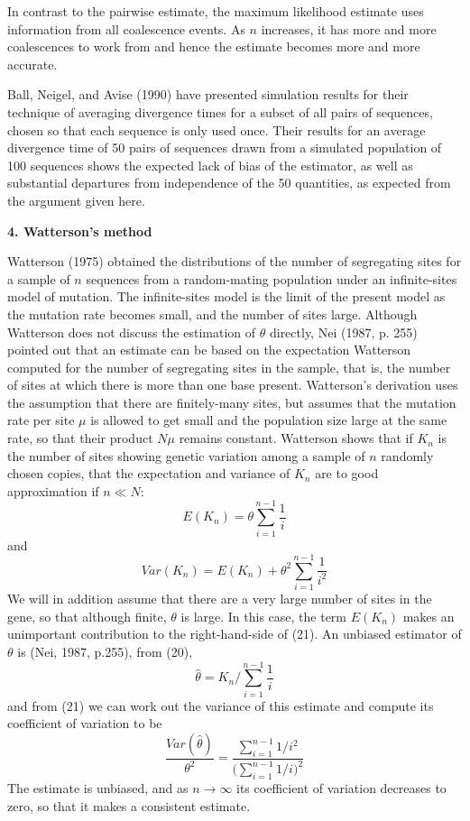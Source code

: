 In contrast to the pairwise estimate, the maximum likelihood estimate uses
information
from all coalescence events.  As $n$ increases, it has more and more
coalescences to work from and hence the estimate becomes more and more
accurate.

Ball, Neigel, and Avise (1990) have presented simulation results for
their technique of averaging divergence times for a subset of all pairs of
sequences, chosen so that each sequence is only used once.  Their
results for an average divergence time of 50 pairs of sequences drawn
from a simulated population of 100 sequences shows the expected lack of
bias of the estimator, as well as substantial departures from
independence of the 50 quantities, as expected from the argument given
here. 

\bigskip

{\bf 4. Watterson's method}

\medskip

Watterson (1975) obtained the distributions of the number of segregating
sites for a sample of $n$ sequences from a random-mating population under
an infinite-sites model of mutation.  The infinite-sites model is the
limit of the present model as the mutation rate becomes small, and the
number of sites large.    Although Watterson does not discuss the estimation
of $\theta$ directly, Nei (1987, p. 255) pointed out that an estimate can be
based on the expectation Watterson computed for the number of segregating
sites in the sample, that is, the
number of sites at which there is more than one base present.
Watterson's derivation uses the assumption that
there are finitely-many sites, but assumes that the mutation rate per site $\mu$
is allowed to get small and the population size large at the same rate,
so that their product $N\mu$ remains constant.  Watterson shows that
if $K_n$ is the number of sites showing genetic variation among a sample
of $n$ randomly chosen copies, that the expectation and variance of $K_n$
are to good approximation if $n \ll N$:
\begin{equation} %
E(K_n)  =  \theta \sum_{i=1}^{n-1} \frac{1}{i}
\end{equation}
and
\begin{equation} %
Var(K_n)  =  E(K_n) + \theta^2 \sum_{i=1}^{n-1} \frac{1}{i^2}
\end{equation}
We will in addition assume that there are a very large number of sites
in the gene, so that although finite, $\theta$ is large.  In this case,
the term $E(K_n)$ makes an unimportant contribution to the right-hand-side
of (21).  An unbiased estimator of $\theta$ is (Nei, 1987, p.255), from (20),
\begin{equation} %
\hat{\theta} =  K_n \bigg/ \sum_{i=1}^{n-1} \frac{1}{i}
\end{equation}
and from (21) we can work out the variance of this estimate and compute its
coefficient of variation to be
\begin{equation} %
\frac{Var(\hat{\theta})}{\theta^2}  = \frac{ \sum_{i=1}^{n-1} 1/i^2}{\bigl(\sum_{i=1}^{n-1} 1/i\bigr)^2}
\end{equation}
The estimate is unbiased, and as $n \rightarrow \infty$ its coefficient of variation
decreases to zero, so that it makes a consistent estimate.

